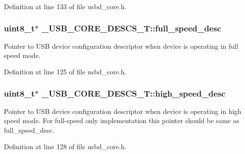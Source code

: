 Definition at line 133 of file usbd\+\_\+core.\+h.

\subsubsection[{\texorpdfstring{full\+\_\+speed\+\_\+desc}{full_speed_desc}}]{\setlength{\rightskip}{0pt plus 5cm}uint8\+\_\+t$\ast$ \+\_\+\+U\+S\+B\+\_\+\+C\+O\+R\+E\+\_\+\+D\+E\+S\+C\+S\+\_\+\+T\+::full\+\_\+speed\+\_\+desc}\hypertarget{struct__USB__CORE__DESCS__T_adc04768aaa60355fd9934895955b7439}{}\label{struct__USB__CORE__DESCS__T_adc04768aaa60355fd9934895955b7439}
Pointer to U\+SB device configuration descriptor when device is operating in full speed mode. 

Definition at line 125 of file usbd\+\_\+core.\+h.

\subsubsection[{\texorpdfstring{high\+\_\+speed\+\_\+desc}{high_speed_desc}}]{\setlength{\rightskip}{0pt plus 5cm}uint8\+\_\+t$\ast$ \+\_\+\+U\+S\+B\+\_\+\+C\+O\+R\+E\+\_\+\+D\+E\+S\+C\+S\+\_\+\+T\+::high\+\_\+speed\+\_\+desc}\hypertarget{struct__USB__CORE__DESCS__T_a99f740c42483df30cc2924383c8a4d2b}{}\label{struct__USB__CORE__DESCS__T_a99f740c42483df30cc2924383c8a4d2b}
Pointer to U\+SB device configuration descriptor when device is operating in high speed mode. For full-\/speed only implementation this pointer should be same as full\+\_\+speed\+\_\+desc. 

Definition at line 128 of file usbd\+\_\+core.\+h.

